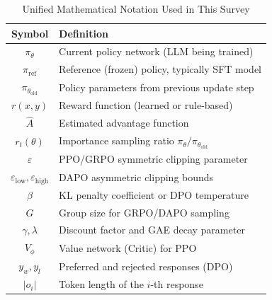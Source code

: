 \begin{table}[ht]
\centering
\caption{Unified Mathematical Notation Used in This Survey}
\label{tab:notation}
\begin{tabular}{cl}
\toprule
\textbf{Symbol} & \textbf{Definition} \\
\midrule
$\pi_\theta$ & Current policy network (LLM being trained) \\
$\pi_{\text{ref}}$ & Reference (frozen) policy, typically SFT model \\
$\pi_{\theta_{\text{old}}}$ & Policy parameters from previous update step \\
$r(x,y)$ & Reward function (learned or rule-based) \\
$\hat{A}$ & Estimated advantage function \\
$r_t(\theta)$ & Importance sampling ratio $\pi_\theta/\pi_{\theta_{\text{old}}}$ \\
$\varepsilon$ & PPO/GRPO symmetric clipping parameter \\
$\varepsilon_{\text{low}}, \varepsilon_{\text{high}}$ & DAPO asymmetric clipping bounds \\
$\beta$ & KL penalty coefficient or DPO temperature \\
$G$ & Group size for GRPO/DAPO sampling \\
$\gamma, \lambda$ & Discount factor and GAE decay parameter \\
$V_\phi$ & Value network (Critic) for PPO \\
$y_w, y_l$ & Preferred and rejected responses (DPO) \\
$|o_i|$ & Token length of the $i$-th response \\
\bottomrule
\end{tabular}
\end{table}
